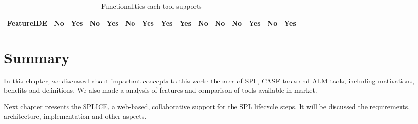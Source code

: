 \begin{landscape}
\begin{table}[!ht]
\begin{center}
\begin{tabular}{|l|l|l|l|l|l|l|l|l|l|l|l|l|l|l|}
    FeatureIDE & No             & Yes          & No             & Yes                         & No             & Yes     & Yes            & Yes          & No                      & No                          & No        & Yes                & No          & Yes          \\ \hline
    \end{tabular}
        \caption{Functionalities each tool supports}
        \label{table:functionalitiestools}
        \end{center}
\end{table}
\end{landscape}

\section{Summary}
\label{sc:summary}
In this chapter, we discussed about important concepts to this work: the area of \acf{SPL}, \acf{CASE} tools and \acf{ALM} tools, including motivations, benefits and definitions. We also made a analysis of features and comparison of tools available in market.

Next chapter presents the \acf{SPLICE}, a web-based, collaborative support for the \ac{SPL} lifecycle steps. It will be discussed the requirements, architecture, implementation and other aspects.

